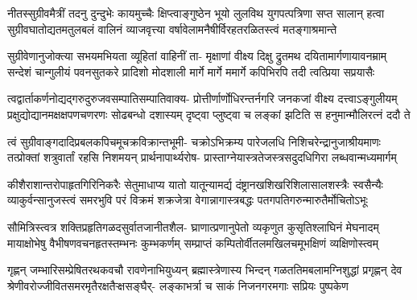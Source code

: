
\translink{}

\storymeta


\fourlineindentedshloka
{नीतस्सुग्रीवमैत्रीं तदनु दुन्दुभेः कायमुच्चैः}
{क्षिप्त्वाङ्गुष्ठेन भूयो लुलविथ युगपत्पत्रिणा सप्त सालान्}
{हत्वा सुग्रीवघातोद्यतमतुलबलं वालिनं व्याजवृत्त्या}
{वर्षावेलामनैषीर्विरहतरळितस्त्वं मतङ्गाश्रमान्ते} %

\fourlineindentedshloka
{सुग्रीवेणानुजोक्त्या सभयमभियता व्यूहितां वाहिनीं ता-}
{मृक्षाणां वीक्ष्य दिक्षु द्रुतमथ दयितामार्गणायावनम्राम्}
{सन्देशं चान्गुलीयं पवनसुतकरे प्रादिशो मोदशाली}
{मार्गे मार्गे ममार्गे कपिभिरपि तदी त्वत्प्रिया सप्रयासैः} %

\fourlineindentedshloka
{त्वद्वार्ताकर्णनोद्यद्गरुदुरुजवसम्पातिसम्पातिवाक्य-}
{प्रोत्तीर्णार्णोधिरन्तर्नगरि जनकजां वीक्ष्य दत्त्वाऽङ्गुलीयम्}
{प्रक्षुद्योद्यानमक्षक्षपणचणरणः सोढबन्धो दशास्यम्}
{दृष्ट्वा प्लुष्ट्वा च लङ्कां झटिति स हनुमान्मौलिरत्नं ददौ ते} %

\fourlineindentedshloka
{त्वं सुग्रीवाङ्गदादिप्रबलकपिचमूचक्रविक्रान्तभूमी-}
{चक्रोऽभिक्रम्य पारेजलधि निशिचरेन्द्रानुजाश्रीयमाणः}
{तत्प्रोक्तां शत्रुवार्तां रहसि निशमयन् प्रार्थनापार्थ्यरोष-}
{प्रास्ताग्नेयास्त्रतेजस्त्रसदुदधिगिरा लब्धवान्मध्यमार्गम्} %

\fourlineindentedshloka
{कीशैराशान्तरोपाहृतगिरिनिकरैः सेतुमाधाप्य यातो}
{यातून्यामर्द्य दंष्ट्रानखशिखरिशिलासालशस्त्रैः स्वसैन्यैः}
{व्याकुर्वन्सानुजस्त्वं समरभुवि परं विक्रमं शक्रजेत्रा}
{वेगान्नागास्त्रबद्धः पतगपतिगरुन्मारुतैर्मोचितोऽभूः} %

\fourlineindentedshloka
{सौमित्रिस्त्वत्र शक्तिप्रहृतिगळदसुर्वातजानीतशैल-}
{घ्राणात्प्रणानुपेतो व्यकृणुत कुसृतिश्लाघिनं मेघनादम्}
{मायाक्षोभेषु वैभीषणवचनहृतस्तम्भनः कुम्भकर्णम्}
{सम्प्राप्तं कम्पितोर्वीतलमखिलचमूभक्षिणं व्यक्षिणोस्त्वम्} %

\fourlineindentedshloka
{गृह्णन् जम्भारिसम्प्रेषितरथकवचौ रावणेनाभियुध्यन्}
{ब्रह्मास्त्रेणास्य भिन्दन् गळततिमबलामग्निशुद्धां प्रगृह्णन्}
{देव श्रेणीवरोज्जीवितसमरमृतैरक्षतैऱ्क्षसङ्घैर्-}
{लङ्काभर्त्रा च साकं निजनगरमगाः सप्रियः पुष्पकेण} %

